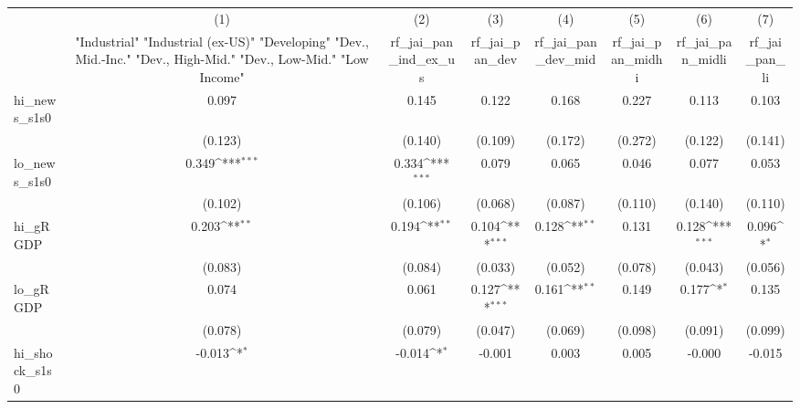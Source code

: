 {
\def\sym#1{\ifmmode^{#1}\else\(^{#1}\)\fi}
\begin{tabular}{l*{7}{c}}
\toprule
            &\multicolumn{1}{c}{(1)}&\multicolumn{1}{c}{(2)}&\multicolumn{1}{c}{(3)}&\multicolumn{1}{c}{(4)}&\multicolumn{1}{c}{(5)}&\multicolumn{1}{c}{(6)}&\multicolumn{1}{c}{(7)}\\
            &\multicolumn{1}{c}{ "Industrial" "Industrial (ex-US)" "Developing" "Dev., Mid.-Inc." "Dev., High-Mid."  "Dev., Low-Mid." "Low Income" }&\multicolumn{1}{c}{rf\_jai\_pan\_ind\_ex\_us}&\multicolumn{1}{c}{rf\_jai\_pan\_dev}&\multicolumn{1}{c}{rf\_jai\_pan\_dev\_mid}&\multicolumn{1}{c}{rf\_jai\_pan\_midhi}&\multicolumn{1}{c}{rf\_jai\_pan\_midli}&\multicolumn{1}{c}{rf\_jai\_pan\_li}\\
\midrule
hi\_news\_s1s0&       0.097         &       0.145         &       0.122         &       0.168         &       0.227         &       0.113         &       0.103         \\
            &     (0.123)         &     (0.140)         &     (0.109)         &     (0.172)         &     (0.272)         &     (0.122)         &     (0.141)         \\
\addlinespace
lo\_news\_s1s0&       0.349\sym{***}&       0.334\sym{***}&       0.079         &       0.065         &       0.046         &       0.077         &       0.053         \\
            &     (0.102)         &     (0.106)         &     (0.068)         &     (0.087)         &     (0.110)         &     (0.140)         &     (0.110)         \\
\addlinespace
hi\_gRGDP    &       0.203\sym{**} &       0.194\sym{**} &       0.104\sym{***}&       0.128\sym{**} &       0.131         &       0.128\sym{***}&       0.096\sym{*}  \\
            &     (0.083)         &     (0.084)         &     (0.033)         &     (0.052)         &     (0.078)         &     (0.043)         &     (0.056)         \\
\addlinespace
lo\_gRGDP    &       0.074         &       0.061         &       0.127\sym{***}&       0.161\sym{**} &       0.149         &       0.177\sym{*}  &       0.135         \\
            &     (0.078)         &     (0.079)         &     (0.047)         &     (0.069)         &     (0.098)         &     (0.091)         &     (0.099)         \\
\addlinespace
hi\_shock\_s1s0&      -0.013\sym{*}  &      -0.014\sym{*}  &      -0.001         &       0.003         &       0.005         &      -0.000         &      -0.015         \\

\end{tabular}}
